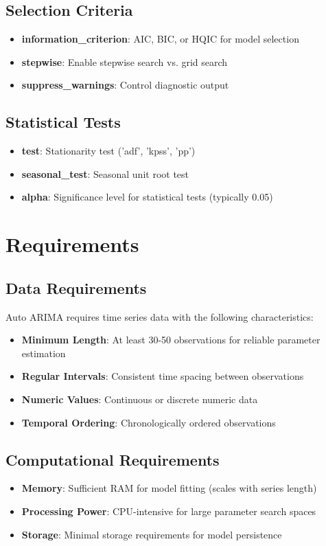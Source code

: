 \subsection{Selection Criteria}
\begin{itemize}
	\item \textbf{information\_criterion}: AIC, BIC, or HQIC for model selection
	\item \textbf{stepwise}: Enable stepwise search vs. grid search
	\item \textbf{suppress\_warnings}: Control diagnostic output
\end{itemize}

\subsection{Statistical Tests}
\begin{itemize}
	\item \textbf{test}: Stationarity test ('adf', 'kpss', 'pp')
	\item \textbf{seasonal\_test}: Seasonal unit root test
	\item \textbf{alpha}: Significance level for statistical tests (typically 0.05)
\end{itemize}

\section{Requirements}
\label{sec:requirements}

\subsection{Data Requirements}
Auto ARIMA requires time series data with the following characteristics:

\begin{itemize}
	\item \textbf{Minimum Length}: At least 30-50 observations for reliable parameter estimation
	\item \textbf{Regular Intervals}: Consistent time spacing between observations
	\item \textbf{Numeric Values}: Continuous or discrete numeric data
	\item \textbf{Temporal Ordering}: Chronologically ordered observations
\end{itemize}

\subsection{Computational Requirements}
\begin{itemize}
	\item \textbf{Memory}: Sufficient RAM for model fitting (scales with series length)
	\item \textbf{Processing Power}: CPU-intensive for large parameter search spaces
	\item \textbf{Storage}: Minimal storage requirements for model persistence
\end{itemize}

